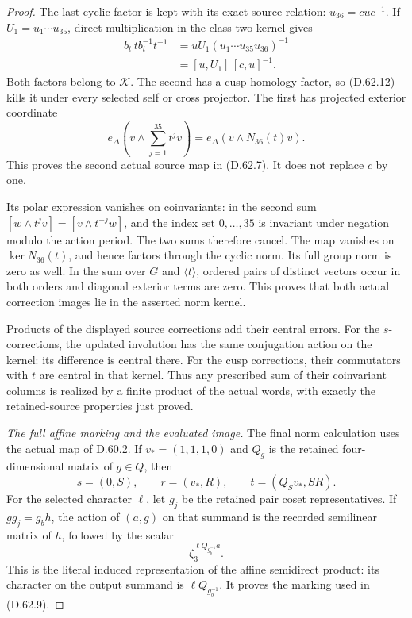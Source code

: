 \begin{proof}
The last cyclic factor is kept
with its exact source relation:
\(u_{36}=cuc^{-1}\). If
\(U_1=u_1\cdots u_{35}\), direct
multiplication in the class-two
kernel gives
\[
 \begin{aligned}
 b_t\,t b_t^{-1}t^{-1}
   &=uU_1(u_1\cdots u_{35}u_{36})^{-1}\\
   &=[u,U_1]\,[c,u]^{-1}.
 \end{aligned}
 \tag{D.62.17}
\]
Both factors belong to \(\mathcal K\).
The second has a cusp homology
factor, so (D.62.12) kills it under
every selected self or cross
projector. The first has projected
exterior coordinate
\[
 e_\Delta\left(v\wedge\sum_{j=1}^{35}t^jv\right)
       =e_\Delta\left(v\wedge N_{36}(t)v\right).
 \tag{D.62.18}
\]
This proves the second actual
source map in (D.62.7). It does
not replace \(c\) by one.

Its polar expression vanishes on
coinvariants: in the second sum
\([w\wedge t^jv]=[v\wedge t^{-j}w]\),
and the index set \(0,\ldots,35\)
is invariant under negation modulo
the action period. The two sums
therefore cancel. The map vanishes
on \(\ker N_{36}(t)\), and hence
factors through the cyclic norm.
Its full group norm is zero as
well. In the sum over \(G\) and
\(\langle t\rangle\), ordered pairs
of distinct vectors occur in both
orders and diagonal exterior terms
are zero. This proves that both
actual correction images lie in
the asserted norm kernel.

Products of the displayed source
corrections add their central errors.
For the \(s\)-corrections, the
updated involution has the same
conjugation action on the kernel:
its difference is central there.
For the cusp corrections, their
commutators with \(t\) are central
in that kernel. Thus any prescribed
sum of their coinvariant columns
is realized by a finite product
of the actual words, with exactly
the retained-source properties just
proved.

\emph{The full affine marking and the evaluated image.}
The final norm calculation uses
the actual map of D.60.2. If
\(v_*=(1,1,1,0)\) and \(Q_g\)
is the retained four-dimensional
matrix of \(g\in Q\), then
\[
 s=(0,S),\qquad r=(v_*,R),\qquad
 t=(Q_Sv_*,SR).
 \tag{D.62.19}
\]
For the selected character \(\ell\),
let \(g_j\) be the retained pair
coset representatives. If
\(gg_j=g_bh\), the action of
\((a,g)\) on that summand is
the recorded semilinear matrix
of \(h\), followed by the scalar
\[
                 \zeta_3^{\ell Q_{g_b^{-1}}a}.
 \tag{D.62.20}
\]
This is the literal induced
representation of the affine
semidirect product: its character
on the output summand is
\(\ell Q_{g_b^{-1}}\). It proves
the marking used in (D.62.9).


\end{proof}

